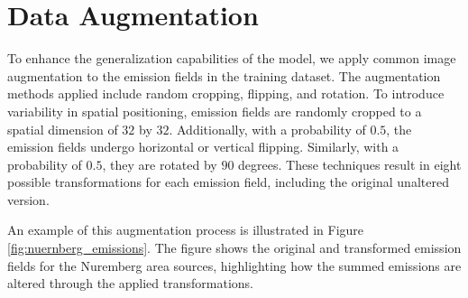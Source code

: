 \section{Data Augmentation}
To enhance the generalization capabilities of the model, we apply common image augmentation \parencite{ImageAugmentation} to the emission fields in the training dataset.
The augmentation methods applied include random cropping, flipping, and rotation.
To introduce variability in spatial positioning, emission fields are randomly cropped to a spatial dimension of $32$ by $32$.
Additionally, with a probability of $0.5$, the emission fields undergo horizontal or vertical flipping.
Similarly, with a probability of $0.5$, they are rotated by $90$ degrees.
These techniques result in eight possible transformations for each emission field, including the original unaltered version.

An example of this augmentation process is illustrated in Figure \ref{fig:nuernberg_emissions}.
The figure shows the original and transformed emission fields for the Nuremberg area sources, highlighting how the summed emissions are altered through the applied transformations.

